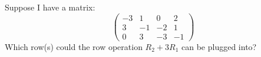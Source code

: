 \documentclass{ximera}
\author{Bart Snapp}
\begin{document}
\begin{exercise}
  Suppose I have a matrix:
  \[
  \begin{pmatrix}
    -3 & 1 & 0 & 2 \\
    3 & -1 & -2 & 1 \\
    0 & 3 & -3 & -1
  \end{pmatrix}
  \]
  Which row(s) could the row operation $R_2+3R_1$ can be plugged into?
  \begin{prompt}
  \begin{selectAll}
  \end{selectAll}
  \end{prompt}
\end{exercise}
\end{document}
